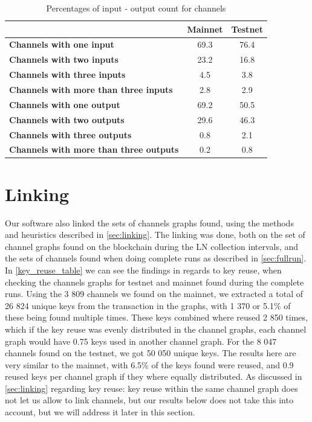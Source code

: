 \begin{table}[ht]
\centering
\caption{Percentages of input - output count for channels}
\label{channel_input_output}
\begin{tabular}{l|c|c}
                                                                      & \textbf{Mainnet} & \textbf{Testnet} \\ \hline
\textbf{Channels with one input}             & 69.3            & 76.4            \\ \hline
\textbf{Channels with two inputs}            & 23.2            & 16.8            \\ \hline
\textbf{Channels with three inputs}          & 4.5             & 3.8             \\ \hline
\textbf{Channels with more than three inputs} & 2.8             & 2.9             \\ \hline
\textbf{Channels with one output}             & 69.2            & 50.5            \\ \hline
\textbf{Channels with two outputs}             & 29.6            & 46.3            \\ \hline
\textbf{Channels with three outputs}            & 0.8             & 2.1             \\ \hline
\textbf{Channels with more than three outputs} & 0.2             & 0.8             \\ \hline
\end{tabular}
\end{table}

\section{Linking}

Our software also linked the sets of channels graphs found, using the methods and heuristics described in \cref{sec:linking}.
The linking was done, both on the set of channel graphs found on the blockchain during the LN collection intervals, and the sets of channels found when doing complete runs as described in \cref{sec:fullrun}. In \cref{key_reuse_table} we can see the findings in regards to key reuse, when checking the channels graphs for testnet and mainnet found during the complete runs. Using the 3 809 channels we found on the mainnet, we extracted a total of 26 824 unique keys from the transaction in the graphs, with 1 370 or 5.1\% of these being found multiple times. These keys combined where reused 2 850 times, which if the key reuse was evenly distributed in the channel graphs, each channel graph would have 0.75 keys used in another channel graph. For the 8 047 channels found on the testnet, we got 50 050 unique keys. The results here are very similar to the mainnet, with 6.5\% of the keys found were reused, and 0.9 reused keys per channel graph if they where equally distributed. As discussed in \cref{sec:linking} regarding key reuse: key reuse within the same channel graph does not let us allow to link channels, but our results below does not take this into account, but we will address it later in this section.
\\

